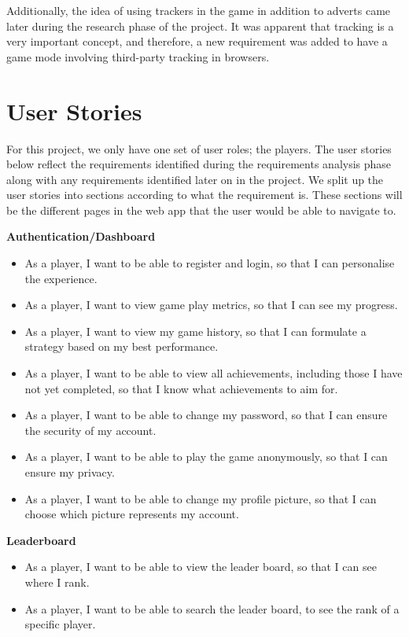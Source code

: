 \documentclass{l4proj}
\begin{document}
Additionally, the idea of using trackers in the game in addition to adverts came later during the research phase of the project. It was apparent that tracking is a very important concept, and therefore, a new requirement was added to have a game mode involving third-party tracking in browsers.

\section{User Stories}
For this project, we only have one set of user roles; the players. The user stories below reflect the requirements identified during the requirements analysis phase along with any requirements identified later on in the project. We split up the user stories into sections according to what the requirement is. These sections will be the different pages in the web app that the user would be able to navigate to.

\textbf{Authentication/Dashboard}
\begin{itemize}
    \item As a player, I want to be able to register and login, so that I can personalise the experience.
    \item As a player, I want to view game play metrics, so that I can see my progress.
    \item As a player, I want to view my game history, so that I can formulate a strategy based on my best performance.
    \item As a player, I want to be able to view all achievements, including those I have not yet completed, so that I know what achievements to aim for.
    \item As a player, I want to be able to change my password, so that I can ensure the security of my account.
    \item As a player, I want to be able to play the game anonymously, so that I can ensure my privacy.
    \item As a player, I want to be able to change my profile picture, so that I can choose which picture represents my account.
\end{itemize}

\textbf{Leaderboard}
\begin{itemize}
    \item As a player, I want to be able to view the leader board, so that I can see where I rank.
    \item As a player, I want to be able to search the leader board, to see the rank of a specific player.
\end{itemize}
\end{document}
